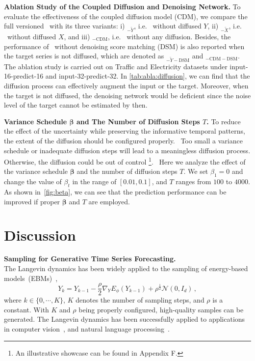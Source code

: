 \textbf{Ablation Study of the Coupled Diffusion and Denoising Network.} 
To evaluate the effectiveness of the coupled diffusion model (CDM), we compare the full versioned \ourmodel ~with its three variants: 
i) \ourmodel $_{-\widetilde{Y}}$, i.e. \ourmodel ~without diffused $Y$, 
ii) \ourmodel $_{-\widetilde{X}}$, i.e. \ourmodel ~without diffused $X$, 
and 
iii) \ourmodel $_{-\mathrm{CDM}}$, i.e. \ourmodel ~without any diffusion. 
Besides, the performance of \ourmodel~without denoising score matching (DSM) is also reported when the target series is not diffused, which are denoted as \ourmodel $_{-\widetilde{Y}-\mathrm{DSM}}$ and \ourmodel $_{-\mathrm{CDM}-\mathrm{DSM}}$. 
The ablation study is carried out on Traffic and Electricity datasets under input-16-predict-16 and input-32-predict-32. 
In \cref{tab:abla:diffusion},  we can find that the diffusion process can effectively augment the input or the target. 
Moreover, when the target is not diffused, the denoising network would be deficient since the noise level of the target cannot be estimated by then. 

\textbf{Variance Schedule $\bm{\beta}$ and The Number of Diffusion Steps $T$.} %
To reduce the effect of the uncertainty while preserving the informative temporal patterns, the extent of the diffusion should be configured properly.~%
Too small a variance schedule or inadequate diffusion steps will lead to a meaningless diffusion process. Otherwise, the diffusion could be out of control {\footnote{
An illustrative showcase can be found in Appendix F. %
}}.~%
Here we analyze the effect of the variance schedule $\bm{\beta}$ and the number of diffusion steps $T$.  
We set $\beta_1 = 0$ and change the value of $\beta_t$ in the range of $[0.01, 0.1]$, and $T$ ranges from $100$ to $4000$.
As shown in~\cref{fig:beta}, we can  see  that the prediction performance can be improved if proper $\bm{\beta}$ and $T$ are employed.

\section{Discussion} \label{discuss}

\textbf{Sampling for Generative Time Series Forecasting.~}\\
The Langevin dynamics has been widely applied to the sampling of energy-based models~(EBMs)~\cite{xie2016theory,du2019implicit,xie2019learning},
\begin{equation}
    Y_k = Y_{k-1} - \frac{\rho}{2}\nabla_{Y}E_{\phi}(Y_{k-1})  + \rho^{\frac{1}{2}} \mathcal{N} (0, I_d) \, ,
\end{equation}
where $k \in \{ 0, \cdots, K \} $, 
$K$ denotes the number of sampling steps, 
and $\rho$ is a constant. 
With $K$ and $\rho$ being properly configured, high-quality samples can be generated.  
The Langevin dynamics has been successfully applied to applications in computer vision~\cite{kumar2019maximum,xie2021generative}, and natural language processing~\cite{deng2020residual}.

